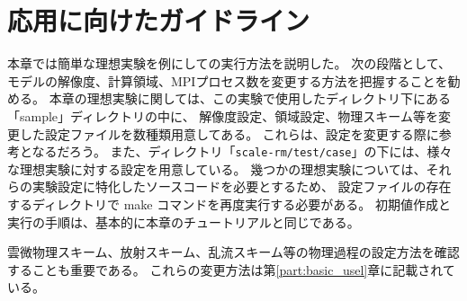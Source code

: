 \section{応用に向けたガイドライン} \label{sec:ideal_exp_last}

本章では簡単な理想実験を例にして{\scalerm}の実行方法を説明した。
次の段階として、モデルの解像度、計算領域、MPIプロセス数を変更する方法を把握することを勧める。
本章の理想実験に関しては、この実験で使用したディレクトリ下にある「sample」ディレクトリの中に、
解像度設定、領域設定、物理スキーム等を変更した設定ファイルを数種類用意してある。
これらは、設定を変更する際に参考となるだろう。
また、ディレクトリ「\verb|scale-rm/test/case|」の下には、様々な理想実験に対する設定を用意している。
幾つかの理想実験については、それらの実験設定に特化したソースコードを必要とするため、
設定ファイルの存在するディレクトリで make コマンドを再度実行する必要がある。
初期値作成と実行の手順は、基本的に本章のチュートリアルと同じである。

雲微物理スキーム、放射スキーム、乱流スキーム等の物理過程の設定方法を確認することも重要である。
これらの変更方法は第\ref{part:basic_usel}章に記載されている。
